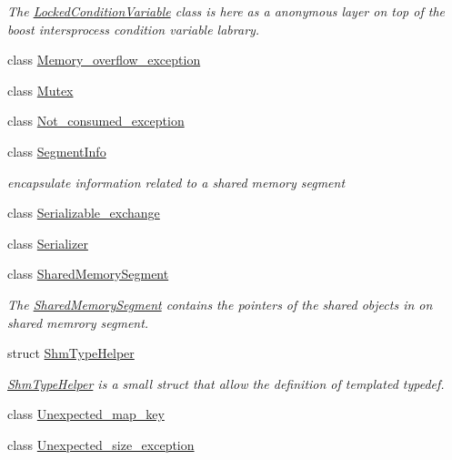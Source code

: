 \begin{DoxyCompactItemize}
\begin{DoxyCompactList}\small\item\em The \hyperlink{classshared__memory_1_1LockedConditionVariable}{Locked\+Condition\+Variable} class is here as a anonymous layer on top of the boost intersprocess condition variable labrary. \end{DoxyCompactList}\item 
class \hyperlink{classshared__memory_1_1Memory__overflow__exception}{Memory\+\_\+overflow\+\_\+exception}
\item 
class \hyperlink{classshared__memory_1_1Mutex}{Mutex}
\item 
class \hyperlink{classshared__memory_1_1Not__consumed__exception}{Not\+\_\+consumed\+\_\+exception}
\item 
class \hyperlink{classshared__memory_1_1SegmentInfo}{Segment\+Info}
\begin{DoxyCompactList}\small\item\em encapsulate information related to a shared memory segment \end{DoxyCompactList}\item 
class \hyperlink{classshared__memory_1_1Serializable__exchange}{Serializable\+\_\+exchange}
\item 
class \hyperlink{classshared__memory_1_1Serializer}{Serializer}
\item 
class \hyperlink{classshared__memory_1_1SharedMemorySegment}{Shared\+Memory\+Segment}
\begin{DoxyCompactList}\small\item\em The \hyperlink{classshared__memory_1_1SharedMemorySegment}{Shared\+Memory\+Segment} contains the pointers of the shared objects in on shared memrory segment. \end{DoxyCompactList}\item 
struct \hyperlink{structshared__memory_1_1ShmTypeHelper}{Shm\+Type\+Helper}
\begin{DoxyCompactList}\small\item\em \hyperlink{structshared__memory_1_1ShmTypeHelper}{Shm\+Type\+Helper} is a small struct that allow the definition of templated typedef. \end{DoxyCompactList}\item 
class \hyperlink{classshared__memory_1_1Unexpected__map__key}{Unexpected\+\_\+map\+\_\+key}
\item 
class \hyperlink{classshared__memory_1_1Unexpected__size__exception}{Unexpected\+\_\+size\+\_\+exception}
\end{DoxyCompactItemize}
